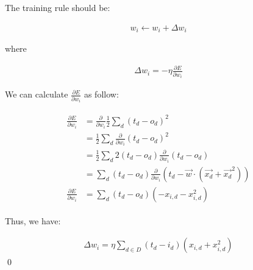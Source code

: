 \documentclass[preview]{standalone}
\begin{document}
\section{}

The training rule should be:

\begin{align}
    w_i\leftarrow w_i + \Delta w_i
\end{align}

where

\begin{align}
    \Delta w_i = -\eta\frac{\partial E}{\partial w_i}
\end{align}

We can calculate $\frac{\partial E}{\partial w_i}$ as follow:

\begin{align}
\begin{split}
\frac{\partial E}{\partial w_i}
&= \frac{\partial}{\partial w_i}\frac{1}{2}\sum_d(t_d-o_d)^2\\
&= \frac{1}{2}\sum_d\frac{\partial}{\partial w_i}(t_d-o_d)^2\\
&= \frac{1}{2}\sum_d2(t_d-o_d)\frac{\partial}{\partial w_i}(t_d-o_d)\\
&= \sum_d(t_d-o_d)\frac{\partial}{\partial w_i}(t_d-\vec{w}\cdot(\vec{x_d}+\vec{x_d}^2))\\
\frac{\partial E}{\partial w_i}
&= \sum_d(t_d-o_d)(-x_{i,d}-x_{i,d}^2)
\end{split}
\end{align}

Thus, we have:

\begin{align}
    \Delta w_i = \eta \sum_{d\in D} (t_d - i_d)(x_{i,d}+x_{i,d}^2)
\end{align}
\qed
\end{document}
